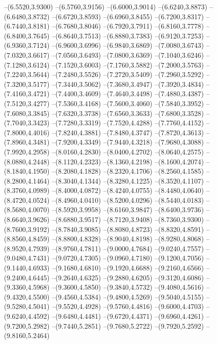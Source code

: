 {	--(6.5520,3.9300)
	--(6.5760,3.9156)
	--(6.6000,3.9014)
	--(6.6240,3.8873)
	--(6.6480,3.8732)
	--(6.6720,3.8593)
	--(6.6960,3.8455)
	--(6.7200,3.8317)
	--(6.7440,3.8181)
	--(6.7680,3.8046)
	--(6.7920,3.7911)
	--(6.8160,3.7778)
	--(6.8400,3.7645)
	--(6.8640,3.7513)
	--(6.8880,3.7383)
	--(6.9120,3.7253)
	--(6.9360,3.7124)
	--(6.9600,3.6996)
	--(6.9840,3.6869)
	--(7.0080,3.6743)
	--(7.0320,3.6617)
	--(7.0560,3.6493)
	--(7.0800,3.6369)
	--(7.1040,3.6246)
	--(7.1280,3.6124)
	--(7.1520,3.6003)
	--(7.1760,3.5882)
	--(7.2000,3.5763)
	--(7.2240,3.5644)
	--(7.2480,3.5526)
	--(7.2720,3.5409)
	--(7.2960,3.5292)
	--(7.3200,3.5177)
	--(7.3440,3.5062)
	--(7.3680,3.4947)
	--(7.3920,3.4834)
	--(7.4160,3.4721)
	--(7.4400,3.4609)
	--(7.4640,3.4498)
	--(7.4880,3.4387)
	--(7.5120,3.4277)
	--(7.5360,3.4168)
	--(7.5600,3.4060)
	--(7.5840,3.3952)
	--(7.6080,3.3845)
	--(7.6320,3.3738)
	--(7.6560,3.3633)
	--(7.6800,3.3528)
	--(7.7040,3.3423)
	--(7.7280,3.3319)
	--(7.7520,4.4288)
	--(7.7760,4.4152)
	--(7.8000,4.4016)
	--(7.8240,4.3881)
	--(7.8480,4.3747)
	--(7.8720,4.3613)
	--(7.8960,4.3481)
	--(7.9200,4.3349)
	--(7.9440,4.3218)
	--(7.9680,4.3088)
	--(7.9920,4.2958)
	--(8.0160,4.2830)
	--(8.0400,4.2702)
	--(8.0640,4.2575)
	--(8.0880,4.2448)
	--(8.1120,4.2323)
	--(8.1360,4.2198)
	--(8.1600,4.2074)
	--(8.1840,4.1950)
	--(8.2080,4.1828)
	--(8.2320,4.1706)
	--(8.2560,4.1585)
	--(8.2800,4.1464)
	--(8.3040,4.1344)
	--(8.3280,4.1225)
	--(8.3520,4.1107)
	--(8.3760,4.0989)
	--(8.4000,4.0872)
	--(8.4240,4.0755)
	--(8.4480,4.0640)
	--(8.4720,4.0524)
	--(8.4960,4.0410)
	--(8.5200,4.0296)
	--(8.5440,4.0183)
	--(8.5680,4.0070)
	--(8.5920,3.9958)
	--(8.6160,3.9847)
	--(8.6400,3.9736)
	--(8.6640,3.9626)
	--(8.6880,3.9517)
	--(8.7120,3.9408)
	--(8.7360,3.9300)
	--(8.7600,3.9192)
	--(8.7840,3.9085)
	--(8.8080,4.8723)
	--(8.8320,4.8591)
	--(8.8560,4.8459)
	--(8.8800,4.8328)
	--(8.9040,4.8198)
	--(8.9280,4.8068)
	--(8.9520,4.7939)
	--(8.9760,4.7811)
	--(9.0000,4.7684)
	--(9.0240,4.7557)
	--(9.0480,4.7431)
	--(9.0720,4.7305)
	--(9.0960,4.7180)
	--(9.1200,4.7056)
	--(9.1440,4.6933)
	--(9.1680,4.6810)
	--(9.1920,4.6688)
	--(9.2160,4.6566)
	--(9.2400,4.6445)
	--(9.2640,4.6325)
	--(9.2880,4.6205)
	--(9.3120,4.6086)
	--(9.3360,4.5968)
	--(9.3600,4.5850)
	--(9.3840,4.5732)
	--(9.4080,4.5616)
	--(9.4320,4.5500)
	--(9.4560,4.5384)
	--(9.4800,4.5269)
	--(9.5040,4.5155)
	--(9.5280,4.5041)
	--(9.5520,4.4928)
	--(9.5760,4.4816)
	--(9.6000,4.4703)
	--(9.6240,4.4592)
	--(9.6480,4.4481)
	--(9.6720,4.4371)
	--(9.6960,4.4261)
	--(9.7200,5.2982)
	--(9.7440,5.2851)
	--(9.7680,5.2722)
	--(9.7920,5.2592)
	--(9.8160,5.2464)
}
